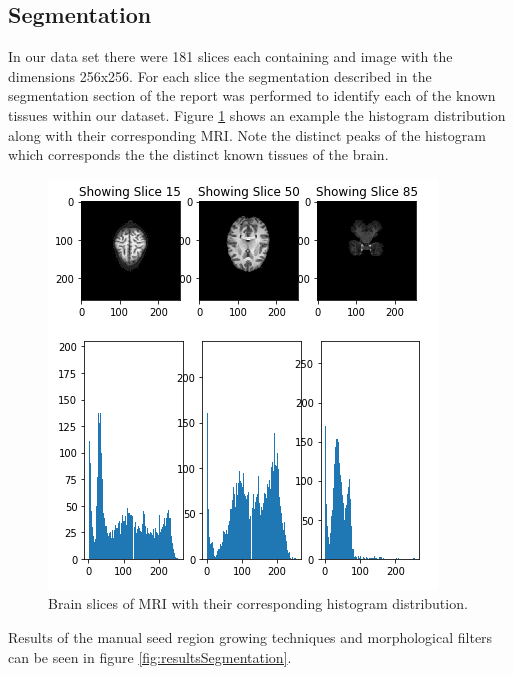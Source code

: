 \subsection{Segmentation}
In our data set there were 181 slices each containing and image with the dimensions 256x256.  For each slice the segmentation described in the segmentation section of the report was performed to identify each of the known tissues within our dataset.  Figure \ref{fig:resultsHistogram} shows an example the histogram distribution along with their corresponding MRI. Note the distinct peaks of the histogram which corresponds the the distinct known tissues of the brain.\\ 

\begin{figure}[H]
  \centering
  \includegraphics[width=\linewidth]{img/resultsHistogram.png}
  \caption{Brain slices of MRI with their corresponding histogram distribution.}
  \label{fig:resultsHistogram}
\end{figure}

Results of the manual seed region growing techniques and morphological filters can be seen in figure \ref{fig:resultsSegmentation}.

